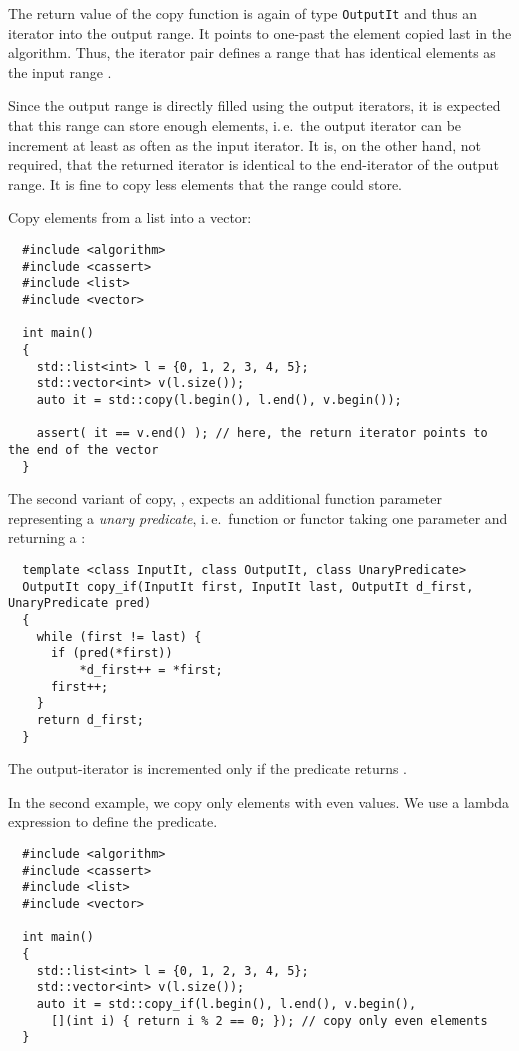 The return value of the copy function is again of type \texttt{OutputIt} and thus an iterator into the output range. It points to one-past the element
copied last in the algorithm. Thus, the iterator pair \cpp{[d_first, return_value)} defines a range that has identical elements as the
input range \cpp{[first, last)}.

Since the output range is directly filled using the output iterators, it is expected that this range can store enough elements, i.\,e.\ the output iterator
can be increment at least as often as the input iterator. It is, on the other hand, not required, that the returned iterator is identical to the end-iterator
of the output range. It is fine to copy less elements that the range could store.

\begin{example}
  Copy elements from a list into a vector:
  \begin{verbatim}
  #include <algorithm>
  #include <cassert>
  #include <list>
  #include <vector>

  int main()
  {
    std::list<int> l = {0, 1, 2, 3, 4, 5};
    std::vector<int> v(l.size());
    auto it = std::copy(l.begin(), l.end(), v.begin());

    assert( it == v.end() ); // here, the return iterator points to the end of the vector
  }
  \end{verbatim}
\end{example}

The second variant of copy, , expects an additional function parameter representing a \emph{unary predicate}, i.\,e.\ function or functor
taking one parameter and returning a :
%
\begin{samepage}
\begin{verbatim}
  template <class InputIt, class OutputIt, class UnaryPredicate>
  OutputIt copy_if(InputIt first, InputIt last, OutputIt d_first, UnaryPredicate pred)
  {
    while (first != last) {
      if (pred(*first))
          *d_first++ = *first;
      first++;
    }
    return d_first;
  }
\end{verbatim}
\end{samepage}
%
The output-iterator is incremented only if the predicate returns .

\begin{example}
  In the second example, we copy only elements with even values. We use a lambda expression to define the predicate.
  \begin{verbatim}
  #include <algorithm>
  #include <cassert>
  #include <list>
  #include <vector>

  int main()
  {
    std::list<int> l = {0, 1, 2, 3, 4, 5};
    std::vector<int> v(l.size());
    auto it = std::copy_if(l.begin(), l.end(), v.begin(),
      [](int i) { return i % 2 == 0; }); // copy only even elements
  }
  \end{verbatim}
\end{example}


